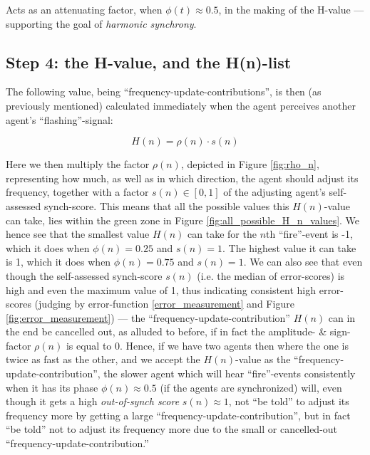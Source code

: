 Acts as an attenuating factor, when $\phi(t)\approx0.5$, in the making of the H-value — supporting the goal of \textit{harmonic synchrony}.

\subsection{Step 4: the H-value, and the H(n)-list}
\label{H_n}

The following value, being ``frequency-update-contributions'', is then (as previously mentioned) calculated immediately when the agent perceives another agent's ``flashing''-signal:

\begin{equation}
\label{h_value}
	H(n) = \rho(n) \cdot s(n)
\end{equation}

Here we then multiply the factor $\rho(n)$, depicted in Figure \ref{fig:rho_n}, representing how much, as well as in which direction, the agent should adjust its frequency, together with a factor $s(n) \in [0,1]$ of the adjusting agent's self-assessed synch-score. This means that all the possible values this $H(n)$-value can take, lies within the green zone in Figure \ref{fig:all_possible_H_n_values}. We hence see that the smallest value $H(n)$ can take for the $n$th ``fire''-event is -1, which it does when $\phi(n) = 0.25$ and $s(n) = 1$. The highest value it can take is 1, which it does when $\phi(n) = 0.75$ and $s(n) = 1$. We can also see that even though the self-assessed synch-score $s(n)$ (i.e. the median of error-scores) is high and even the maximum value of 1, thus indicating consistent high error-scores (judging by error-function \eqref{error_measurement} and Figure \ref{fig:error_measurement}) — the ``frequency-update-contribution'' $H(n)$ can in the end be cancelled out, as alluded to before, if in fact the amplitude- \& sign-factor $\rho(n)$ is equal to 0. Hence, if we have two agents then where the one is twice as fast as the other, and we accept the $H(n)$-value as the ``frequency-update-contribution'', the slower agent which will hear ``fire''-events consistently when it has its phase $\phi(n) \approx 0.5$ (if the agents are synchronized) will, even though it gets a high \textit{out-of-synch score} $s(n) \approx 1$, not ``be told'' to adjust its frequency more by getting a large ``frequency-update-contribution'', but in fact ``be told'' not to adjust its frequency more due to the small or cancelled-out ``frequency-update-contribution.''

